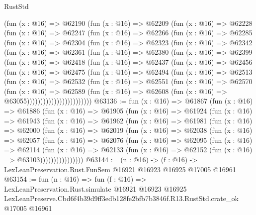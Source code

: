\begin{lexlean}{RustStd}
\begin{coremodule}
    (fun (x : @16) =>
    @62190
      (fun (x : @16) =>
      @62209
        (fun (x : @16) =>
        @62228
          (fun (x : @16) =>
          @62247
            (fun (x : @16) =>
            @62266
              (fun (x : @16) =>
              @62285
                (fun (x : @16) =>
                @62304
                  (fun (x : @16) =>
                  @62323
                    (fun (x : @16) =>
                    @62342
                      (fun (x : @16) =>
                      @62361
                        (fun (x : @16) =>
                        @62380
                          (fun (x : @16) =>
                          @62399
                            (fun (x : @16) =>
                            @62418
                              (fun (x : @16) =>
                              @62437
                                (fun (x : @16) =>
                                @62456
                                  (fun (x : @16) =>
                                  @62475
                                    (fun (x : @16) =>
                                    @62494
                                      (fun (x : @16) =>
                                      @62513
                                        (fun (x : @16) =>
                                        @62532
                                          (fun (x : @16) =>
                                          @62551
                                            (fun (x : @16) =>
                                            @62570
                                              (fun (x : @16) =>
                                              @62589
                                                (fun (x : @16) =>
                                                @62608
                                                  (fun (x : @16) => @63055))))))))))))))))))))))))
@63136 := fun (x : @16) =>
  @61867
    (fun (x : @16) =>
    @61886
      (fun (x : @16) =>
      @61905
        (fun (x : @16) =>
        @61924
          (fun (x : @16) =>
          @61943
            (fun (x : @16) =>
            @61962
              (fun (x : @16) =>
              @61981
                (fun (x : @16) =>
                @62000
                  (fun (x : @16) =>
                  @62019
                    (fun (x : @16) =>
                    @62038
                      (fun (x : @16) =>
                      @62057
                        (fun (x : @16) =>
                        @62076
                          (fun (x : @16) =>
                          @62095
                            (fun (x : @16) =>
                            @62114
                              (fun (x : @16) =>
                              @62133
                                (fun (x : @16) => @62152 (fun (x : @16) => @63103))))))))))))))))
@63144 := (n : @16) ->
  (f : @16) -> LexLeanPreservation.Rust.FunSem @16921 @16923 @16925 @17005 @16961
@63154 := fun (n : @16) =>
  fun (f : @16) =>
  LexLeanPreservation.Rust.simulate
    @16921
    @16923
    @16925
    LexLeanPreserve.Cbd6f4b39d9ff3edb128fe2bfb7b3846f.R13.RustStd.crate_ok
    @17005
    @16961
\end{coremodule}
\end{lexlean}
